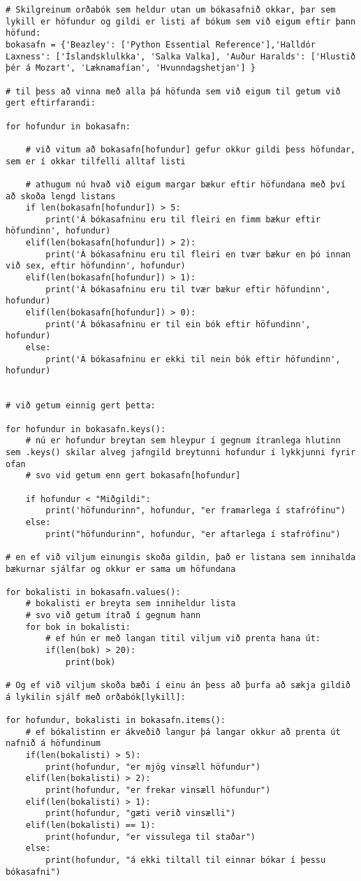 \begin{lstlisting}[caption=Skoðum hvernig megi ítra í gegnum orðabækur, label=lst:dict-bokasafn]
# Skilgreinum orðabók sem heldur utan um bókasafnið okkar, þar sem lykill er höfundur og gildi er listi af bókum sem við eigum eftir þann höfund:
bokasafn = {'Beazley': ['Python Essential Reference'],'Halldór Laxness': ['Íslandsklulkka', 'Salka Valka], 'Auður Haralds': ['Hlustið þér á Mozart', 'Læknamafían', 'Hvunndagshetjan'] }

# til þess að vinna með alla þá höfunda sem við eigum til getum við gert eftirfarandi:

for hofundur in bokasafn:
	
	# við vitum að bokasafn[hofundur] gefur okkur gildi þess höfundar, sem er í okkar tilfelli alltaf listi
	
	# athugum nú hvað við eigum margar bækur eftir höfundana með því að skoða lengd listans
	if len(bokasafn[hofundur]) > 5:
		print('Á bókasafninu eru til fleiri en fimm bækur eftir höfundinn', hofundur)
	elif(len(bokasafn[hofundur]) > 2):
		print('Á bókasafninu eru til fleiri en tvær bækur en þó innan við sex, eftir höfundinn', hofundur)
	elif(len(bokasafn[hofundur]) > 1):
		print('Á bókasafninu eru til tvær bækur eftir höfundinn', hofundur)
	elif(len(bokasafn[hofundur]) > 0):
		print('Á bókasafninu er til ein bók eftir höfundinn', hofundur)
	else:
		print('Á bókasafninu er ekki til nein bók eftir höfundinn', hofundur)
		
		
# við getum einnig gert þetta:

for hofundur in bokasafn.keys():
	# nú er hofundur breytan sem hleypur í gegnum ítranlega hlutinn sem .keys() skilar alveg jafngild breytunni hofundur í lykkjunni fyrir ofan
	# svo vid getum enn gert bokasafn[hofundur]
	
	if hofundur < "Miðgildi":
		print('höfundurinn", hofundur, "er framarlega í stafrófinu")
	else:
		print("höfundurinn", hofundur, "er aftarlega í stafrófinu")
		
# en ef við viljum einungis skoða gildin, það er listana sem innihalda bækurnar sjálfar og okkur er sama um höfundana

for bokalisti in bokasafn.values():
	# bokalisti er breyta sem inniheldur lista
	# svo við getum ítrað í gegnum hann
	for bok in bokalisti:
		# ef hún er með langan titil viljum við prenta hana út:
		if(len(bok) > 20):
			print(bok)
			
# Og ef við viljum skoða bæði í einu án þess að þurfa að sækja gildið á lykilin sjálf með orðabók[lykill]:

for hofundur, bokalisti in bokasafn.items():
	# ef bókalistinn er ákveðið langur þá langar okkur að prenta út nafnið á höfundinum
	if(len(bokalisti) > 5):
		print(hofundur, "er mjög vinsæll höfundur")
	elif(len(bokalisti) > 2):
		print(hofundur, "er frekar vinsæll höfundur")
	elif(len(bokalisti) > 1):
		print(hofundur, "gæti verið vinsælli")
	elif(len(bokalisti) == 1):
		print(hofundur, "er vissulega til staðar")
	else:
		print(hofundur, "á ekki tiltall til einnar bókar í þessu bókasafni")
\end{lstlisting}

